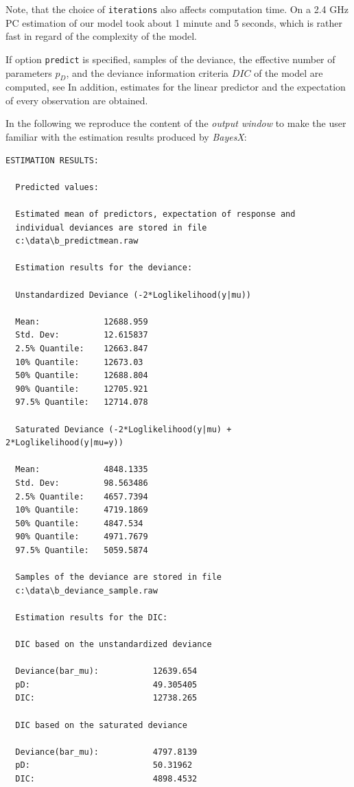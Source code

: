 \documentclass[a4paper]{article}
\begin{document}
Note, that the choice of {\tt iterations} also affects computation
time. On a 2.4 GHz PC estimation of our model took about 1 minute
and 5 seconds, which is rather fast in regard of the complexity of
the model.

If option {\tt predict} is specified, samples of the deviance, the
effective number of parameters $p_D$, and the deviance information
criteria $DIC$ of the model are computed, see  In addition, estimates for the linear
predictor and the expectation of every observation are obtained.

In the following we reproduce the content of the {\em output
window} to make the user familiar with the estimation results
produced by {\em BayesX}:

\footnotesize
\begin{verbatim}
ESTIMATION RESULTS:

  Predicted values:

  Estimated mean of predictors, expectation of response and
  individual deviances are stored in file
  c:\data\b_predictmean.raw

  Estimation results for the deviance:

  Unstandardized Deviance (-2*Loglikelihood(y|mu))

  Mean:             12688.959
  Std. Dev:         12.615837
  2.5% Quantile:    12663.847
  10% Quantile:     12673.03
  50% Quantile:     12688.804
  90% Quantile:     12705.921
  97.5% Quantile:   12714.078

  Saturated Deviance (-2*Loglikelihood(y|mu) + 2*Loglikelihood(y|mu=y))

  Mean:             4848.1335
  Std. Dev:         98.563486
  2.5% Quantile:    4657.7394
  10% Quantile:     4719.1869
  50% Quantile:     4847.534
  90% Quantile:     4971.7679
  97.5% Quantile:   5059.5874

  Samples of the deviance are stored in file
  c:\data\b_deviance_sample.raw

  Estimation results for the DIC:

  DIC based on the unstandardized deviance

  Deviance(bar_mu):           12639.654
  pD:                         49.305405
  DIC:                        12738.265

  DIC based on the saturated deviance

  Deviance(bar_mu):           4797.8139
  pD:                         50.31962
  DIC:                        4898.4532


\end{verbatim}
\end{document}
